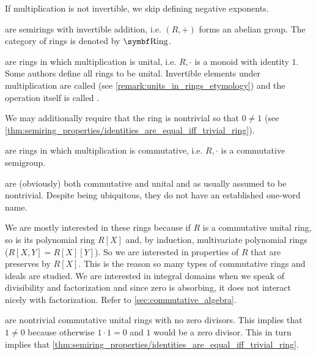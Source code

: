 \begin{definition}
\begin{defenum}
    If multiplication is not invertible, we skip defining negative exponents.

      are semirings with invertible addition, i.e. \( (R, +) \) forms an abelian group. The category of rings is denoted by \( \Cat{Ring} \).

      are rings in which multiplication is unital, i.e. \( R, \cdot \) is a monoid with identity \( 1 \). Some authors define all rings to be unital. Invertible elements under multiplication are called  (see \cref{remark:units_in_rings_etymology}) and the operation itself is called .

    We may additionally require that the ring is nontrivial so that \( 0 \neq 1 \) (see \cref{thm:semiring_properties/identities_are_equal_iff_trivial_ring}).

      are rings in which multiplication is commutative, i.e. \( R, \cdot \) is a commutative semigroup.

      are (obviously) both commutative and unital and as usually assumed to be nontrivial. Despite being ubiquitous, they do not have an established one-word name.

    We are mostly interested in these rings because if \( R \) is a commutative unital ring, so is its polynomial ring \( R[X] \) and, by induction, multivariate polynomial rings (\( R[X, Y] = R[X][Y] \)). So we are interested in properties of \( R \) that are preserves by \( R[X] \). This is the reason so many types of commutative rings and ideals are studied. We are interested in integral domains when we speak of divisibility and factorization and since zero is absorbing, it does not interact nicely with factorization. Refer to \cref{sec:commutative_algebra}.

      are nontrivial commutative unital rings with no zero divisors. This implies that \( 1 \neq 0 \) because otherwise \( 1 \cdot 1 = 0 \) and \( 1 \) would be a zero divisor. This in turn implies that \cref{thm:semiring_properties/identities_are_equal_iff_trivial_ring}.


\end{defenum}
\end{definition}

